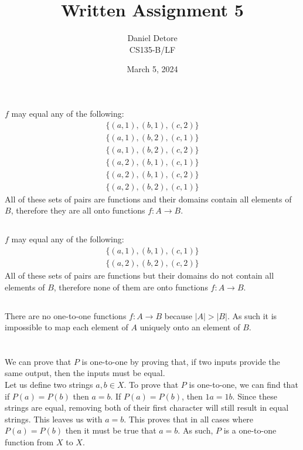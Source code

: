 \documentclass{article}
\title{Written Assignment 5}
\author{Daniel Detore\\CS135-B/LF}
\date{March 5, 2024}
\begin{document}
\maketitle
\raggedright

\section{}
\subsection{}
$f$ may equal any of the following:
\begin{gather*}
    \{ (a, 1), (b, 1), (c, 2) \} \\
    \{ (a, 1), (b, 2), (c, 1) \} \\
    \{ (a, 1), (b, 2), (c, 2) \} \\
    \{ (a, 2), (b, 1), (c, 1) \} \\
    \{ (a, 2), (b, 1), (c, 2) \} \\
    \{ (a, 2), (b, 2), (c, 1) \}
\end{gather*}
All of these sets of pairs are functions and their domains contain all elements 
of $B$, therefore they are all onto functions $f: A \rightarrow B$.

\subsection{}
$f$ may equal any of the following:
\begin{gather*}
    \{ (a, 1), (b, 1), (c, 1) \} \\
    \{ (a, 2), (b, 2), (c, 2) \}
\end{gather*}
All of these sets of pairs are functions but their domains do not contain all 
elements of $B$, therefore none of them are onto functions $f: A \rightarrow B$.

\subsection{}
There are no one-to-one functions $f: A \rightarrow B$ because $|A| > |B|$. As such
it is impossible to map each element of $A$ uniquely onto an element of $B$.

\section{}
\subsection{}
We can prove that $P$ is one-to-one by proving that, if two inputs provide the same output, then the inputs must be equal.\\
Let us define two strings $a, b \in X$. To prove that $P$ is one-to-one, we can find that if $P(a) = P(b)$ then $a = b$. 
If $P(a) = P(b)$, then $1a = 1b$.
Since these strings are equal, removing both of their first character will still result in equal strings. This leaves us with $a = b$. 
This proves that in all cases where $P(a) = P(b)$ then it must be true that $a = b$. As such, $P$ is a one-to-one function from $X$ to $X$.
\end{document}
